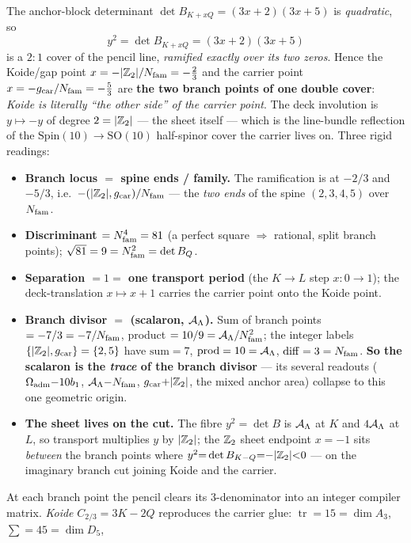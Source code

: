 \begin{keybox}
The anchor-block determinant $\det B_{K+xQ}=(3x+2)(3x+5)$ is \emph{quadratic}, so
\[
  \boxed{\ y^2=\det B_{K+xQ}=(3x+2)(3x+5)\ }
\]
is a $2{:}1$ cover of the pencil line, \emph{ramified exactly over its two zeros}. Hence the Koide/gap point
$x=-|\mathbb{Z}_2|/N_{\mathrm{fam}}=-\tfrac23$ and the carrier point $x=-g_{\mathrm{car}}/N_{\mathrm{fam}}=-\tfrac53$ are \textbf{the two branch points of
one double cover}: \emph{Koide is literally ``the other side'' of the carrier point}. The deck involution is
$y\mapsto-y$ of degree $2=|\mathbb{Z}_2|$ --- the sheet itself --- which is the line-bundle reflection of the
$\mathrm{Spin}(10)\!\to\!\mathrm{SO}(10)$ half-spinor cover the carrier lives on. Three rigid readings:
\begin{itemize}\setlength\itemsep{1pt}
  \item \textbf{Branch locus $=$ spine ends / family.} The ramification is at $-2/3$ and $-5/3$, i.e.\
  $-(|\mathbb{Z}_2|,g_{\mathrm{car}})/N_{\mathrm{fam}}$ --- the \emph{two ends} of the spine $(2,3,4,5)$ over $N_{\mathrm{fam}}$.
  \item \textbf{Discriminant $=N_{\mathrm{fam}}^4=81$} (a perfect square $\Rightarrow$ rational, split branch points);
  $\sqrt{81}=9=N_{\mathrm{fam}}^2=\det B_Q$.
  \item \textbf{Separation $=1=$ one transport period} (the $K\!\to\!L$ step $x:0\!\to\!1$); the deck-translation
  $x\mapsto x+1$ carries the carrier point onto the Koide point.
  \item \textbf{Branch divisor $=$ (scalaron, $\mathcal A_\Lambda$).} Sum of branch points $=-7/3=-7/N_{\mathrm{fam}}$, product $=10/9=\mathcal A_\Lambda/N_{\mathrm{fam}}^2$;
  the integer labels $\{|\mathbb{Z}_2|,g_{\mathrm{car}}\}=\{2,5\}$ have $\mathrm{sum}=7$, $\mathrm{prod}=10=\mathcal A_\Lambda$, $\mathrm{diff}=3=N_{\mathrm{fam}}$.
  \textbf{So the scalaron is the \emph{trace} of the branch divisor} --- its several readouts ($\Omega_{\mathrm{adm}}{-}10b_1$,
  $\mathcal A_\Lambda{-}N_{\mathrm{fam}}$, $g_{\mathrm{car}}{+}|\mathbb{Z}_2|$, the mixed anchor area) collapse to this one geometric origin.
  \item \textbf{The sheet lives on the cut.} The fibre $y^2{=}\det B$ is $\mathcal A_\Lambda$ at $K$ and $4\mathcal A_\Lambda$ at $L$, so transport
  multiplies $y$ by $|\mathbb{Z}_2|$; the $\mathbb{Z}_2$ sheet endpoint $x{=}{-}1$ sits \emph{between} the branch points where
  $y^2{=}\det B_{K-Q}{=}{-}|\mathbb{Z}_2|{<}0$ --- on the imaginary branch cut joining Koide and the carrier.
\end{itemize}
\noindent At each branch point the pencil clears its $3$-denominator into an integer compiler matrix.
\emph{Koide} $C_{2/3}=3K-2Q$ reproduces the carrier glue: $\operatorname{tr}=15=\dim A_3$, $\textstyle\sum=45=\dim D_5$,

\end{keybox}
